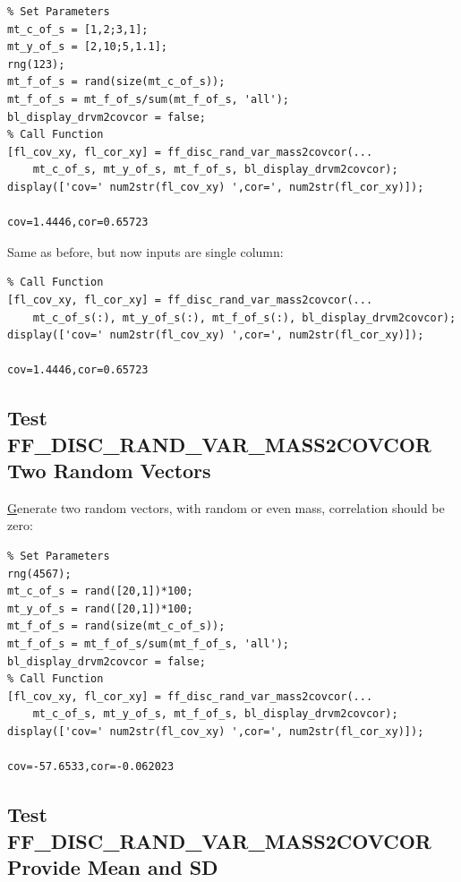 \documentclass[
]{book}
\begin{document}
\begin{verbatim}
% Set Parameters
mt_c_of_s = [1,2;3,1];
mt_y_of_s = [2,10;5,1.1];
rng(123);
mt_f_of_s = rand(size(mt_c_of_s));
mt_f_of_s = mt_f_of_s/sum(mt_f_of_s, 'all');
bl_display_drvm2covcor = false;
% Call Function
[fl_cov_xy, fl_cor_xy] = ff_disc_rand_var_mass2covcor(...
    mt_c_of_s, mt_y_of_s, mt_f_of_s, bl_display_drvm2covcor);
display(['cov=' num2str(fl_cov_xy) ',cor=', num2str(fl_cor_xy)]);

cov=1.4446,cor=0.65723
\end{verbatim}

Same as before, but now inputs are single column:

\begin{verbatim}
% Call Function
[fl_cov_xy, fl_cor_xy] = ff_disc_rand_var_mass2covcor(...
    mt_c_of_s(:), mt_y_of_s(:), mt_f_of_s(:), bl_display_drvm2covcor);
display(['cov=' num2str(fl_cov_xy) ',cor=', num2str(fl_cor_xy)]);

cov=1.4446,cor=0.65723
\end{verbatim}

\hypertarget{test-ff_disc_rand_var_mass2covcor-two-random-vectors}{%
\subsection{Test FF\_DISC\_RAND\_VAR\_MASS2COVCOR Two Random Vectors}\label{test-ff_disc_rand_var_mass2covcor-two-random-vectors}}

\href{https://fanwangecon.github.io/Stat4Econ/probability_discrete/htmlpdfr/poisson.html}{G}enerate
two random vectors, with random or even mass, correlation should be
zero:

\begin{verbatim}
% Set Parameters
rng(4567);
mt_c_of_s = rand([20,1])*100;
mt_y_of_s = rand([20,1])*100;
mt_f_of_s = rand(size(mt_c_of_s));
mt_f_of_s = mt_f_of_s/sum(mt_f_of_s, 'all');
bl_display_drvm2covcor = false;
% Call Function
[fl_cov_xy, fl_cor_xy] = ff_disc_rand_var_mass2covcor(...
    mt_c_of_s, mt_y_of_s, mt_f_of_s, bl_display_drvm2covcor);
display(['cov=' num2str(fl_cov_xy) ',cor=', num2str(fl_cor_xy)]);

cov=-57.6533,cor=-0.062023
\end{verbatim}

\hypertarget{test-ff_disc_rand_var_mass2covcor-provide-mean-and-sd}{%
\subsection{Test FF\_DISC\_RAND\_VAR\_MASS2COVCOR Provide Mean and SD}\label{test-ff_disc_rand_var_mass2covcor-provide-mean-and-sd}}
\end{document}
